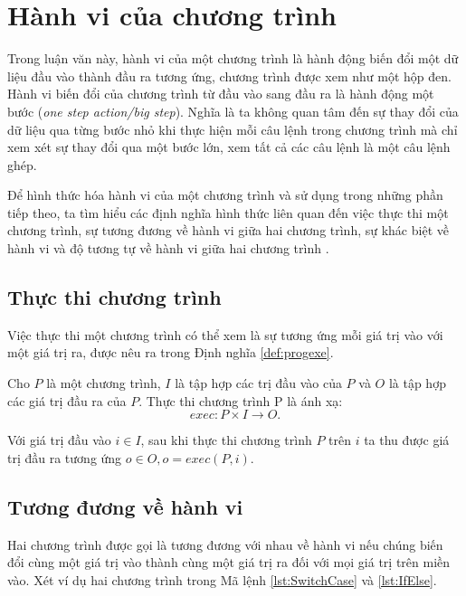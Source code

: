 \section{Hành vi của chương trình }
\label{sec:behavior}

Trong luận văn này, hành vi của một chương trình là hành động biến đổi
một dữ liệu đầu vào thành đầu ra tương ứng, chương trình được xem như
một hộp đen. Hành vi biến đổi của chương trình từ đầu vào sang đầu ra
là hành động một bước (\emph{one step action/big step}). Nghĩa là ta
không quan tâm đến sự thay đổi của dữ liệu qua từng bước nhỏ khi thực
hiện mỗi câu lệnh trong chương trình mà chỉ xem xét sự thay đổi qua
một bước lớn, xem tất cả các câu lệnh là một câu lệnh ghép.

Để hình thức hóa hành vi của một chương trình và sử dụng trong những
phần tiếp theo, ta tìm hiểu các định nghĩa hình thức liên quan đến
việc thực thi một chương trình, sự tương đương về hành vi giữa hai
chương trình, sự khác biệt về hành vi và độ tương tự về hành vi giữa
hai chương trình \cite{li2016measuring}.
        
\subsection{Thực thi chương trình}

Việc thực thi một chương trình có thể xem là sự tương ứng mỗi giá trị 
vào với một giá trị ra, được nêu ra trong Định nghĩa \ref{def:progexe}.

\begin{definition}
  \label{def:progexe}
  Cho $P$ là một chương trình, $I$ là tập hợp các trị đầu vào của $P$
  và $O$ là tập hợp các giá trị đầu ra của $P$. Thực thi chương trình
  P là ánh xạ:
  \[exec: P \times I \rightarrow O.
  \]
\end{definition}

Với giá trị đầu vào $i \in I$, sau khi thực thi chương trình $P$ trên
$i$ ta thu được giá trị đầu ra tương ứng $o \in O, o = exec(P, i)$.

\subsection{Tương đương về hành vi}

Hai chương trình được gọi là tương đương với nhau về hành vi nếu chúng
biến đổi cùng một giá trị vào thành cùng một giá trị ra đối với mọi
giá trị trên miền vào. Xét ví dụ hai chương trình trong Mã lệnh
\ref{lst:SwitchCase} và \ref{lst:IfElse}.

